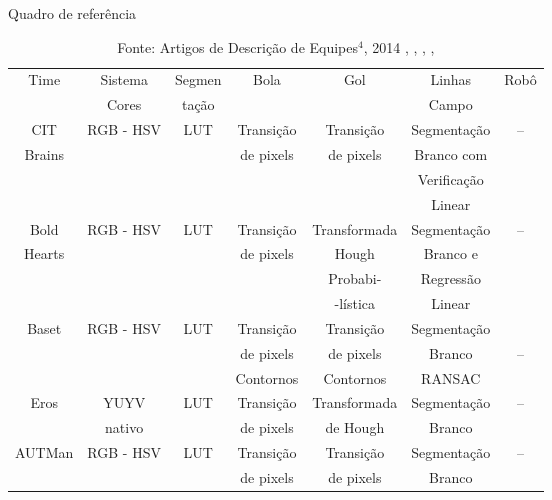 \begin{table}[ht!]
    \caption{Quadro de referência} \label{tbl:Times}
    \centering
    \begin{tabular}{|c|c|c|c|c|c|c|}
    \hline 
    Time 	& Sistema 	& Segmen  	& Bola		& Gol 		   & Linhas	   & Robô	\\ 
    	 	& Cores   	& tação		& 		&     		   & Campo	   & 	 	\\ 
    \hline 

    CIT 	& RGB - HSV 	& LUT	  	& Transição	&  Transição	   & Segmentação   & --	     	\\
    Brains	& 	 	& 	  	& de pixels	&  de pixels	   & Branco com    &	     	\\
    		& 	 	& 	  	& 		&  	 	   & Verificação   &	     	\\
    		& 	 	& 	  	& 		&  	 	   & Linear        &	     	\\

    \hline 

    Bold 	& RGB - HSV 	& LUT	  	& Transição	&  Transformada	   & Segmentação   & --     	\\
    Hearts	& 	 	& 	  	& de pixels	&  Hough 	   & Branco e      &	     	\\
    		& 	 	& 	  	& 		&  Probabi-  	   & Regressão     &	     	\\
    		& 	 	& 	  	& 		&  -lística	   & Linear        &	     	\\
    \hline 

    Baset	& RGB - HSV 	& LUT	  	& Transição	&  Transição	   & Segmentação   &            \\
    		& 	 	& 	  	& de pixels	&  de pixels	   & Branco        & --     	\\
    		& 	 	& 	  	& Contornos	&  Contornos       & RANSAC        &	     	\\
    \hline 

    Eros	& YUYV  	& LUT	  	& Transição	&  Transformada	   & Segmentação   & --	     	\\
    		& nativo	& 	  	& de pixels	&  de Hough	   & Branco        &	     	\\

    \hline 
     
    AUTMan	& RGB - HSV 	& LUT	  	& Transição	&  Transição	   & Segmentação   & --	     \\
    		& 	 	& 	  	& de pixels	&  de pixels       & Branco        &	     \\
    \hline

    \end{tabular}
    \caption*{Fonte: Artigos de Descrição de Equipes$^4$, 2014 \cite{AUTMan}, \cite{Bold}, \cite{CIT}, \cite{Baset}, \cite{EROS} }

\end{table}

